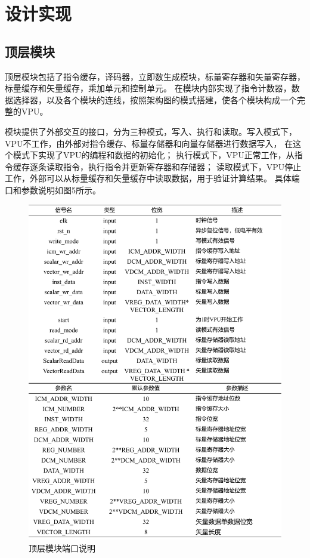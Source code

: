 \documentclass[UTF8]{ctexart}
\begin{document}
\section{设计实现}
\subsection{顶层模块}
顶层模块包括了指令缓存，译码器，立即数生成模块，标量寄存器和矢量寄存器，标量缓存和矢量缓存，乘加单元和控制单元。
在模块内部实现了指令计数器，数据选择器，以及各个模块的连线，按照架构图的模式搭建，使各个模块构成一个完整的VPU。

模块提供了外部交互的接口，分为三种模式，写入、执行和读取。写入模式下，VPU不工作，由外部对指令缓存、标量存储器和向量存储器进行数据写入，
在这个模式下实现了VPU的编程和数据的初始化；
执行模式下，VPU正常工作，从指令缓存逐条读取指令，执行指令并更新寄存器和存储器；
读取模式下，VPU停止工作，外部可以从标量缓存和矢量缓存中读取数据，用于验证计算结果。
具体端口和参数说明如图5所示。

\begin{figure}[htbp]
    \centering
    \includegraphics[width=16cm]{pic/VPU.png}
    \caption{顶层模块端口说明}
\end{figure}
\end{document}
